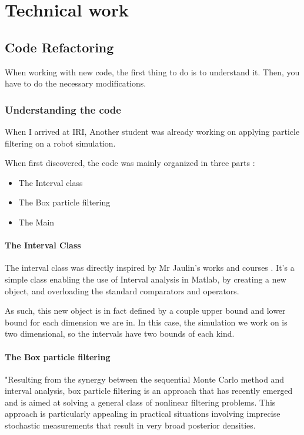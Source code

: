 \chapter{Technical work}

\label{technic}

\newcommand{\keyword}[1]{\textbf{#1}}
\newcommand{\tabhead}[1]{\textbf{#1}}
\newcommand{\code}[1]{\texttt{#1}}
\newcommand{\file}[1]{\texttt{\bfseries#1}}
\newcommand{\option}[1]{\texttt{\itshape#1}}


\section{Code Refactoring}
When working with new code, the first thing to do is to understand it. Then, you have to do the necessary modifications.
\subsection{Understanding the code}
When I arrived at IRI, Another student was already working on applying particle filtering on a robot simulation.

When first discovered, the code was mainly organized in three parts :
\begin{itemize}
  \item The Interval class
  \item The Box particle filtering
  \item The Main
\end{itemize}
\subsubsection{The Interval Class}
The interval class was directly inspired by Mr Jaulin's works and courses \parencite{IAMOOC}.
It's a simple class enabling the use of Interval analysis in Matlab, by creating a new object, and overloading the standard comparators and operators.

As such, this new object is in fact defined by a couple upper bound and lower bound for each dimension we are in.
In this case, the simulation we work on is two dimensional, so the intervals have two bounds of each kind.
\subsubsection{The Box particle filtering}
"Resulting from the synergy between the sequential Monte Carlo method and interval analysis, box particle filtering is an approach that has recently emerged and is aimed at solving a general class of nonlinear filtering problems.
This approach is particularly appealing in practical situations involving imprecise stochastic measurements that result in very broad posterior densities.

